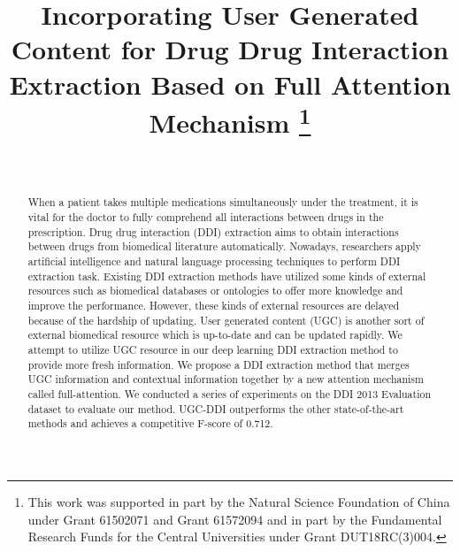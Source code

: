 \documentclass[conference]{IEEEtran}
\begin{document}
\title{Incorporating User Generated Content for Drug Drug Interaction Extraction Based on Full Attention Mechanism
\thanks{This work was supported in part by the Natural Science Foundation of China under Grant 61502071 and Grant 61572094 and in part by the Fundamental Research Funds for the Central Universities under Grant DUT18RC(3)004.}
}

\author{
\\
}

\maketitle

\begin{abstract}
When a patient takes multiple medications simultaneously under the treatment, it is vital for the doctor to fully comprehend all interactions between drugs in the prescription.
Drug drug interaction (DDI) extraction aims to obtain interactions between drugs from biomedical literature automatically.
Nowadays, researchers apply artificial intelligence and natural language processing techniques to perform DDI extraction task.
Existing DDI extraction methods have utilized some kinds of external resources such as biomedical databases or ontologies to offer more knowledge and improve the performance.
However, these kinds of external resources are delayed because of the hardship of updating.
User generated content (UGC) is another sort of external biomedical resource which is up-to-date and can be updated rapidly.
We attempt to utilize UGC resource in our deep learning DDI extraction method to provide more fresh information.
We propose a DDI extraction method that merges UGC information and contextual information together by a new attention mechanism called full-attention.
We conducted a series of experiments on the DDI 2013 Evaluation dataset to evaluate our method.
UGC-DDI outperforms the other state-of-the-art methods and achieves a competitive F-score of 0.712.
\end{abstract}
\end{document}
